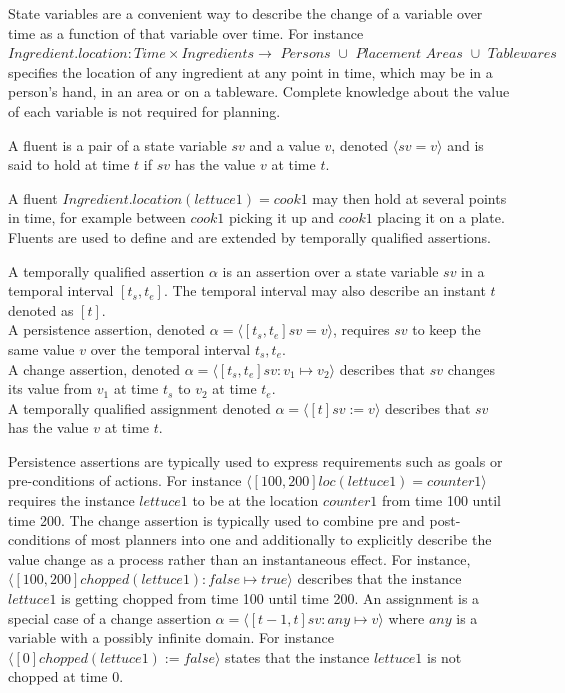 State variables are a convenient way to describe the change of a variable over time as a function of that variable over time.
For instance $Ingredient.location: Time \times \textit{Ingredients} \rightarrow \textit{ Persons } \cup \textit{ Placement Areas } \cup \textit{ Tablewares }$ specifies the location of any ingredient at any point in time, which may be in a person's hand, in an area or on a tableware.
Complete knowledge about the value of each variable is not required for planning.

\begin{definition}[Fluent]
  A fluent is a pair of a state variable $sv$ and a value $v$, denoted $\langle sv=v \rangle$ and is said to hold at time $t$ if $sv$ has the value $v$ at time $t$.
\end{definition}

A fluent $Ingredient.location(lettuce1) = cook1$ may then hold at several points in time, for example between $cook1$ picking it up and $cook1$ placing it on a plate.
Fluents are used to define and are extended by temporally qualified assertions.

\begin{definition}
  A temporally qualified assertion $\alpha$ is an assertion over a state variable $sv$ in a temporal interval $[t_s,t_e]$.
  The temporal interval may also describe an instant $t$ denoted as $[t]$.\\
  A persistence assertion, denoted $\alpha = \langle [t_s,t_e] sv=v \rangle$, requires $sv$ to keep the same value $v$ over the temporal interval $t_s,t_e$.\\
  A change assertion, denoted $\alpha = \langle [t_s,t_e] sv : v_1 \mapsto v_2 \rangle$ describes that $sv$ changes its value from $v_1$ at time $t_s$ to $v_2$ at time $t_e$. \\
  A temporally qualified assignment denoted $\alpha = \langle [t] sv := v \rangle$ describes that $sv$ has the value $v$ at time $t$.
\end{definition}

Persistence assertions are typically used to express requirements such as goals or pre-conditions of actions.
For instance $\langle[100,200] loc(lettuce1) = counter1\rangle$ requires the instance $lettuce1$ to be at the location $counter1$ from time 100 until time 200.
The change assertion is typically used to combine pre and post-conditions of most planners into one and additionally to explicitly describe the value change as a process rather than an instantaneous effect.
For instance, $\langle [100,200] chopped(lettuce1) : \mathit{false} \mapsto \mathit{true} \rangle$ describes that the instance $lettuce1$ is getting chopped from time 100 until time 200.
An assignment is a special case of a change assertion $\alpha = \langle [t-1,t] sv: any \mapsto v \rangle$ where $any$ is a variable with a possibly infinite domain.
For instance $\langle [0] chopped(lettuce1) := \mathit{false} \rangle$ states that the instance $lettuce1$ is not chopped at time 0.

